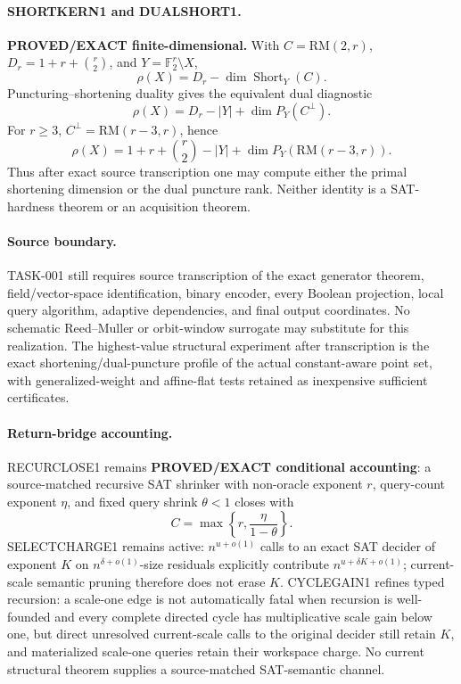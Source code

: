 \documentclass[11pt]{article}
\begin{document}
\paragraph{SHORTKERN1 and DUALSHORT1.}
\textbf{PROVED/EXACT finite-dimensional.}  With \(C=\mathrm{RM}(2,r)\), \(D_r=1+r+\binom r2\), and \(Y=\mathbb F_2^r\setminus X\),
\[
 \rho(X)=D_r-\dim\operatorname{Short}_Y(C).
\]
Puncturing--shortening duality gives the equivalent dual diagnostic
\[
 \boxed{\rho(X)=D_r-|Y|+\dim P_Y(C^\perp).}
\]
For \(r\ge3\), \(C^\perp=\mathrm{RM}(r-3,r)\), hence
\[
 \boxed{
 \rho(X)=1+r+\binom r2-|Y|+
 \dim P_Y\!\left(\mathrm{RM}(r-3,r)\right).
 }
\]
Thus after exact source transcription one may compute either the primal shortening dimension or the dual puncture rank.  Neither identity is a SAT-hardness theorem or an acquisition theorem.

\paragraph{Source boundary.}
TASK-001 still requires source transcription of the exact generator theorem, field/vector-space identification, binary encoder, every Boolean projection, local query algorithm, adaptive dependencies, and final output coordinates.  No schematic Reed--Muller or orbit-window surrogate may substitute for this realization.  The highest-value structural experiment after transcription is the exact shortening/dual-puncture profile of the actual constant-aware point set, with generalized-weight and affine-flat tests retained as inexpensive sufficient certificates.

\paragraph{Return-bridge accounting.}
RECURCLOSE1 remains \textbf{PROVED/EXACT conditional accounting}: a source-matched recursive SAT shrinker with non-oracle exponent \(r\), query-count exponent \(\eta\), and fixed query shrink \(\theta<1\) closes with
\[
 C=\max\left\{r,\frac{\eta}{1-\theta}\right\}.
\]
SELECTCHARGE1 remains active: \(n^{u+o(1)}\) calls to an exact SAT decider of exponent \(K\) on \(n^{\delta+o(1)}\)-size residuals explicitly contribute \(n^{u+\delta K+o(1)}\); current-scale semantic pruning therefore does not erase \(K\).  CYCLEGAIN1 refines typed recursion: a scale-one edge is not automatically fatal when recursion is well-founded and every complete directed cycle has multiplicative scale gain below one, but direct unresolved current-scale calls to the original decider still retain \(K\), and materialized scale-one queries retain their workspace charge.  No current structural theorem supplies a source-matched SAT-semantic channel.
\end{document}
